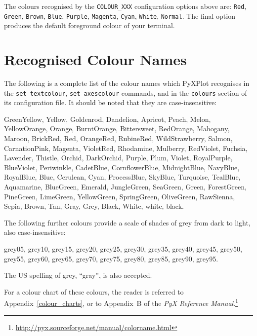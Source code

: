 The colours recognised by the {\tt COLOUR\_XXX} configuration options above are: {\tt Red}, {\tt Green}, {\tt Brown}, {\tt Blue}, {\tt Purple}, {\tt Magenta}, {\tt Cyan}, {\tt White}, {\tt Normal}. The final option produces the default foreground colour of your terminal.

\section{Recognised Colour Names}
\label{colour_names}

The following is a complete list of the colour names which PyXPlot recognises in the {\tt set textcolour}, {\tt set axescolour} commands, and in the {\tt colours} section of its configuration file. It should be noted that they are case-insensitive:

GreenYellow, Yellow, Goldenrod, Dandelion, Apricot, Peach, Melon, YellowOrange, Orange, BurntOrange, Bittersweet, RedOrange, Mahogany, Maroon, BrickRed, Red, OrangeRed, RubineRed, WildStrawberry, Salmon, CarnationPink, Magenta, VioletRed, Rhodamine, Mulberry, RedViolet, Fuchsia, Lavender, Thistle, Orchid, DarkOrchid, Purple, Plum, Violet, RoyalPurple, BlueViolet, Periwinkle, CadetBlue, CornflowerBlue, MidnightBlue, NavyBlue, RoyalBlue, Blue, Cerulean, Cyan, ProcessBlue, SkyBlue, Turquoise, TealBlue, Aquamarine, BlueGreen, Emerald, JungleGreen, SeaGreen, Green, ForestGreen, PineGreen, LimeGreen, YellowGreen, SpringGreen, OliveGreen, RawSienna, Sepia, Brown, Tan, Gray, Grey, Black, White, white, black.

The following further colours provide a scale of shades of grey from dark to light, also case-insensitive:

grey05, grey10, grey15, grey20, grey25, grey30, grey35, grey40, grey45, grey50, grey55, grey60, grey65, grey70, grey75, grey80, grey85, grey90, grey95.

The US spelling of grey, ``gray'', is also accepted.

For a colour chart of these colours, the reader is referred to Appendix~\ref{colour_charts}, or to Appendix~B of the {\it PyX Reference Manual}.\footnote{\url{http://pyx.sourceforge.net/manual/colorname.html}}
